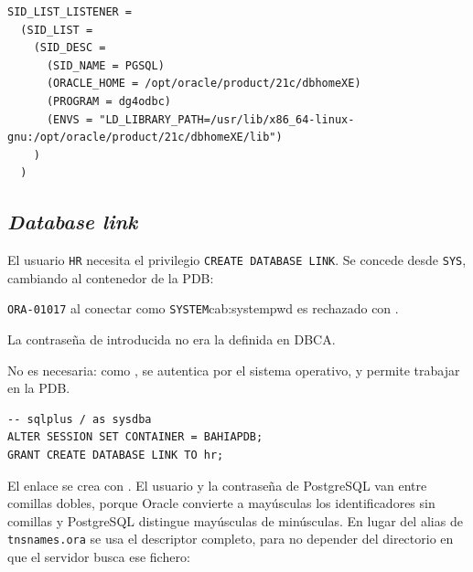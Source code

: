 \begin{lstlisting}[caption={Registro estático añadido a \texttt{listener.ora}}]
SID_LIST_LISTENER =
  (SID_LIST =
    (SID_DESC =
      (SID_NAME = PGSQL)
      (ORACLE_HOME = /opt/oracle/product/21c/dbhomeXE)
      (PROGRAM = dg4odbc)
      (ENVS = "LD_LIBRARY_PATH=/usr/lib/x86_64-linux-gnu:/opt/oracle/product/21c/dbhomeXE/lib")
    )
  )
\end{lstlisting}


\subsection{\textit{Database link}}

El usuario \texttt{HR} necesita el privilegio \texttt{CREATE DATABASE LINK}. Se concede desde \texttt{SYS}, cambiando al contenedor de la PDB:

\begin{cabezazo}{\texttt{ORA-01017} al conectar como \texttt{SYSTEM}}{cab:systempwd}
\problema {} es rechazado
con .

\causa La contraseña de  introducida no era la definida en DBCA.

\solucion No es necesaria: como ,  se
autentica por el sistema operativo, y 
permite trabajar en la PDB.
\end{cabezazo}

\begin{lstlisting}[style=sql]
-- sqlplus / as sysdba
ALTER SESSION SET CONTAINER = BAHIAPDB;
GRANT CREATE DATABASE LINK TO hr;
\end{lstlisting}


El enlace se crea con . El usuario y la contraseña de PostgreSQL van entre comillas dobles, porque Oracle convierte a mayúsculas los identificadores sin comillas y PostgreSQL distingue mayúsculas de minúsculas. En lugar del alias de \texttt{tnsnames.ora} se usa el descriptor completo, para no depender del directorio en que el servidor busca ese fichero:

